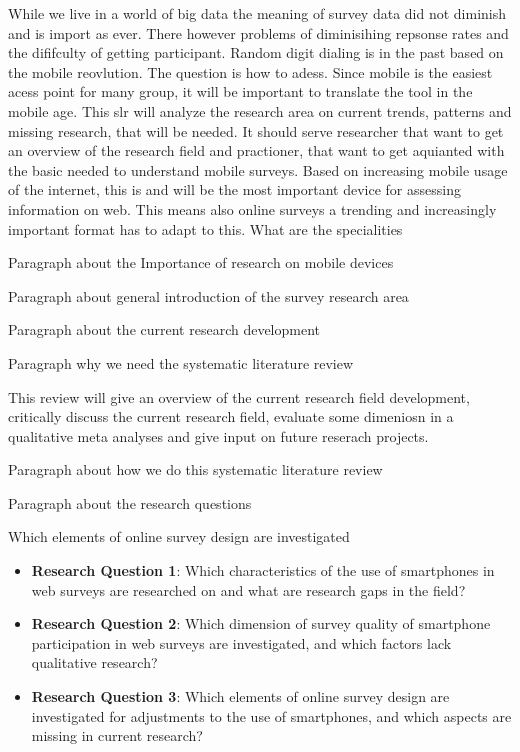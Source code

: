 While we live in a world of big data the meaning of survey data did not diminish and is import as ever. There however problems of diminisihing repsonse rates and the dififculty of getting participant. Random digit dialing is in the past based on the mobile reovlution. The question is how to adess. Since mobile is the easiest acess point for many group, it will be important to translate the tool in the mobile age. This slr will analyze the research area on current trends, patterns and missing research, that will be needed. It should serve researcher that want to get an overview of the research field and practioner, that want to get aquianted with the basic needed to understand mobile surveys. 
Based on increasing mobile usage of the internet, this is and will be the most important device for assessing information on web. This means also online surveys a trending and increasingly important format has to adapt to this. What are the specialities

Paragraph about the Importance of research on mobile devices

Paragraph about general introduction of the survey research area

Paragraph about the current research development

Paragraph why we need the systematic literature review

This review will give an overview of the current research field development, critically discuss the current research field, evaluate some dimeniosn in a qualitative meta analyses and give input on future reserach projects.

Paragraph about how we do this systematic literature review

Paragraph about the research questions


Which elements of online survey design are investigated 

\begin{itemize}
   \item \textbf{Research Question 1}: Which characteristics of the use of smartphones in web surveys are researched on and what are research gaps in the field? 
   \item \textbf{Research Question 2}: Which dimension of survey quality of smartphone participation in web surveys are investigated, and which factors lack qualitative research?
   \item \textbf{Research Question 3}: Which elements of online survey design are investigated for adjustments to the use of smartphones, and which aspects are missing in current research?
\end{itemize}

